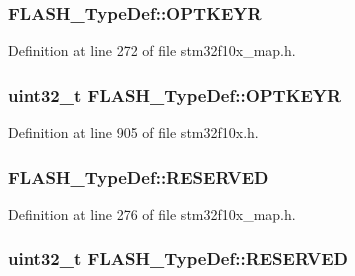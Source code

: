 \subsubsection[{\texorpdfstring{O\+P\+T\+K\+E\+YR}{OPTKEYR}}]{ F\+L\+A\+S\+H\+\_\+\+Type\+Def\+::\+O\+P\+T\+K\+E\+YR}\hypertarget{struct_f_l_a_s_h___type_def_af5b4bedcba9817f71402bf0718946f4c}{}\label{struct_f_l_a_s_h___type_def_af5b4bedcba9817f71402bf0718946f4c}


Definition at line 272 of file stm32f10x\+\_\+map.\+h.

\subsubsection[{\texorpdfstring{O\+P\+T\+K\+E\+YR}{OPTKEYR}}]{ {\bf uint32\+\_\+t} F\+L\+A\+S\+H\+\_\+\+Type\+Def\+::\+O\+P\+T\+K\+E\+YR}\hypertarget{struct_f_l_a_s_h___type_def_a793cd13a4636c9785fdb99316f7fd7ab}{}\label{struct_f_l_a_s_h___type_def_a793cd13a4636c9785fdb99316f7fd7ab}


Definition at line 905 of file stm32f10x.\+h.

\subsubsection[{\texorpdfstring{R\+E\+S\+E\+R\+V\+ED}{RESERVED}}]{ F\+L\+A\+S\+H\+\_\+\+Type\+Def\+::\+R\+E\+S\+E\+R\+V\+ED}\hypertarget{struct_f_l_a_s_h___type_def_aedad829a49c236af05c13a075538fbcf}{}\label{struct_f_l_a_s_h___type_def_aedad829a49c236af05c13a075538fbcf}


Definition at line 276 of file stm32f10x\+\_\+map.\+h.

\subsubsection[{\texorpdfstring{R\+E\+S\+E\+R\+V\+ED}{RESERVED}}]{ {\bf uint32\+\_\+t} F\+L\+A\+S\+H\+\_\+\+Type\+Def\+::\+R\+E\+S\+E\+R\+V\+ED}\hypertarget{struct_f_l_a_s_h___type_def_a32e5cc660e711dc5424f827e2d4efd88}{}\label{struct_f_l_a_s_h___type_def_a32e5cc660e711dc5424f827e2d4efd88}


